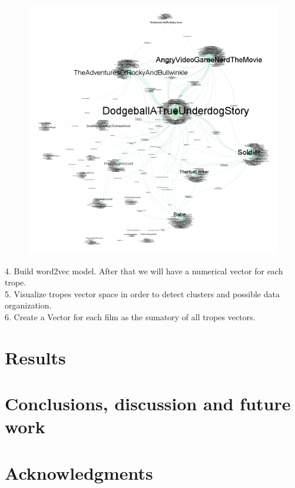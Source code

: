 \documentclass[letterpaper]{article}
\begin{document}
	\begin{figure}
		\centering
		\includegraphics[width=0.9\linewidth]{../data/gephi/pairs_films-trope_1k_v3}
		\caption{}
		\label{fig:pairsfilms-trope1kv3}
	\end{figure}

	4. Build word2vec model. After that we will have a numerical vector for each trope. \\
	5. Visualize tropes vector space in order to detect clusters and possible data organization. \\ 
	6. Create a Vector for each film as the sumatory of all tropes vectors. \\

        \section{Results}
        \label{sec:res}
        
        \section{Conclusions, discussion and future work}
        
	\section{Acknowledgments}
	
	
	
	
\end{document}
